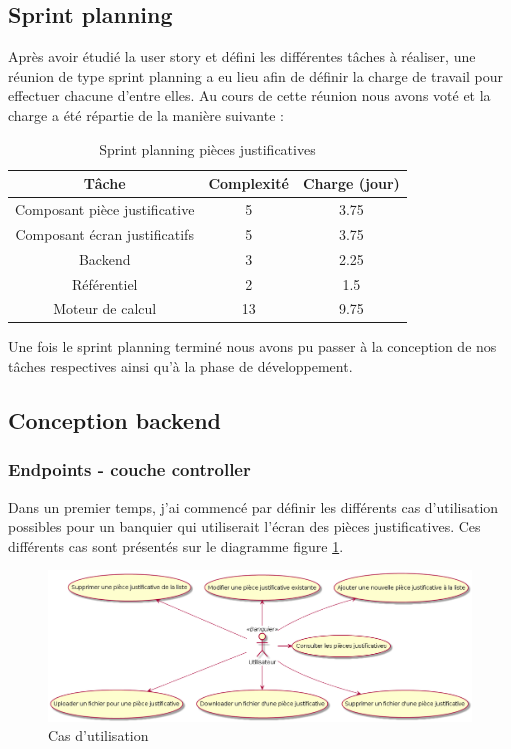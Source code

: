 \subsection{Sprint planning}
	Après avoir étudié la user story et défini les différentes tâches à réaliser, une réunion de type sprint planning a eu lieu afin de définir la charge de travail pour effectuer chacune d'entre elles. Au cours de cette réunion nous avons voté et la charge a été répartie de la manière suivante :
	
\begin{table}[h!]
	\center
	\begin{tabular}{| c | c | c |}
     \hline
     Tâche & Complexité & Charge (jour)\\ \hline
     Composant pièce justificative & 5 & 3.75\\ \hline
     Composant écran justificatifs & 5 & 3.75\\ \hline
     Backend & 3 & 2.25\\ \hline
     Référentiel & 2 & 1.5\\ \hline
     Moteur de calcul & 13 & 9.75\\
     \hline
	\end{tabular}
	\caption{Sprint planning pièces justificatives}
	\label{sprintPlanningPJ}
\end{table}

	Une fois le sprint planning terminé nous avons pu passer à la conception de nos tâches respectives ainsi qu'à la phase de développement.

\subsection{Conception backend}

	\subsubsection{Endpoints - couche controller}

	Dans un premier temps, j'ai commencé par définir les différents cas d'utilisation possibles pour un banquier qui utiliserait l'écran des pièces justificatives. Ces différents cas sont présentés sur le diagramme figure \ref{useCasePJ}.

\begin{figure}[h!]
	\includegraphics[scale=0.50]{images/travailBP1818/piecesJustif/useCasePJ.png}
	\centering
	\caption{Cas d'utilisation}
	\label{useCasePJ}
\end{figure}

